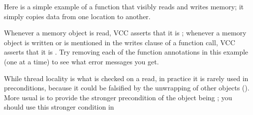 Here is a simple example of a function that visibly reads and writes
memory; it simply copies data from one location to another.



Whenever a memory object is read, VCC asserts that it is
; whenever a memory object is written or is
mentioned in the writes clause of a function call, VCC asserts that it
is . Try removing each of the function annotations in
this example (one at a time) to see what error messages you get.

While thread locality is what is checked on a read, in practice it is
rarely used in preconditions, because it could be falsified by the
unwrapping of other objects (). 
More usual is to provide the stronger precondition of the object being
\vcc{\unwrapped}; you should use this stronger condition in 



